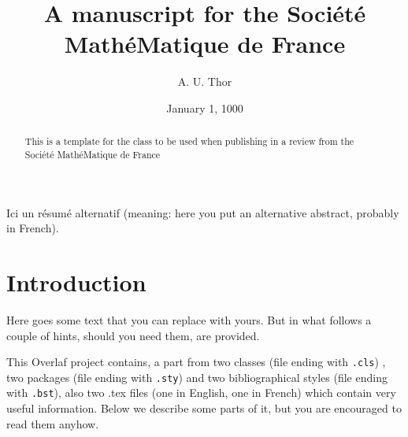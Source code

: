 \documentclass[11pt,english]{smfart}
\title[Template]{A manuscript for the Soci\'et\'e Ma\-th\'e\-Ma\-ti\-que de France}%
\date {January 1, 1000}
\author[A.T.]{A. U. Thor}%
\begin{document}
\begin{abstract}
This is a template for the class to be used when publishing in a review from the Soci\'et\'e Ma\-th\'e\-Ma\-ti\-que de France
\end{abstract}

\begin{altabstract}
Ici un r\'esum\'e alternatif (meaning: here you put an alternative abstract, probably in French).
\end{altabstract}
\maketitle

\tableofcontents

\section{Introduction}
Here goes some text that you can replace with yours. But in what follows a couple of hints, should you need them, are provided.

This Overlaf project contains, a part from two classes (file ending with \texttt{.cls}) , two packages (file ending with \texttt{.sty}) and two bibliographical styles (file ending with \texttt{.bst}), also two .tex files (one in English, one in French) which contain very useful information. Below we describe some parts of it, but you are encouraged to read them anyhow.
\end{document}
